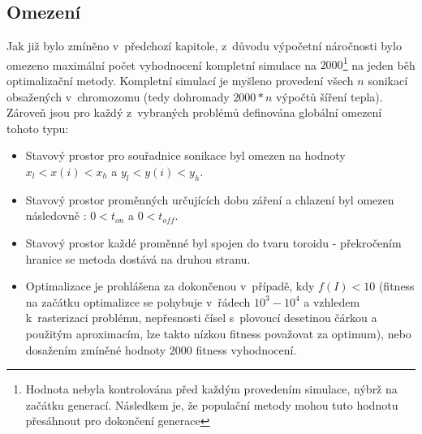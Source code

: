 \subsection{Omezení}
Jak již bylo zmíněno v~předchozí kapitole, z~důvodu výpočetní náročnosti bylo omezeno maximální počet vyhodnocení kompletní simulace na $2000$\footnote{Hodnota nebyla kontrolována před každým provedením simulace, nýbrž na začátku generací. Následkem je, že populační metody mohou tuto hodnotu přesáhnout pro dokončení generace} na jeden běh optimalizační metody. Kompletní simulací je myšleno provedení všech $n$ sonikací obsažených v~chromozomu (tedy dohromady $2000 * n$ výpočtů šíření tepla). Zároveň jsou pro každý z~vybraných problémů definována globální omezení tohoto typu:
\begin{itemize}
    \item Stavový prostor pro souřadnice sonikace byl omezen na hodnoty $x_l < x(i) < x_h$ a $y_l < y(i) < y_h$.
    \item Stavový prostor proměnných určujících dobu záření a chlazení byl omezen následovně : $0 < t_{on}$ a $0 < t_{off}$.
    \item Stavový prostor každé proměnné byl spojen do tvaru toroidu - překročením hranice se metoda dostává na druhou stranu.
    \item Optimalizace je prohlášena za dokončenou v~případě, kdy $f(I) < 10$ (fitness na začátku optimalizce se pohybuje v~řádech $10^3 - 10^4$ a vzhledem k~rasterizaci problému, nepřesnosti čísel s~plovoucí desetinou čárkou a použitým aproximacím, lze takto nízkou fitness považovat za optimum), nebo dosažením zmíněné hodnoty $2000$ fitness vyhodnocení.
\end{itemize}
 
